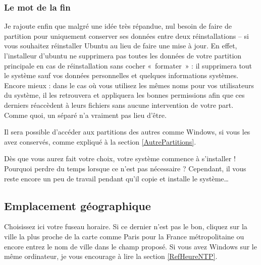 \subsubsection{Le mot de la fin}
Je rajoute enfin que malgré une idée très répandue, nul besoin de faire de partition  pour uniquement conserver ses données entre deux réinstallations -- si vous souhaitez réinstaller Ubuntu au lieu de faire une mise à jour. En effet, l'installeur d'ubuntu ne supprimera pas toutes les données de votre partition principale \Chemin{/} en cas de réinstallation sans cocher «~formater~» : il supprimera tout le système sauf vos données personnelles et quelques informations systèmes. Encore mieux : dans le cas où vous utilisez les mêmes noms pour vos utilisateurs du système, il les retrouvera et appliquera les bonnes permissions afin que ces derniers réaccèdent à leurs fichiers sans aucune intervention de votre part. Comme quoi, un  séparé n'a vraiment pas lieu d'être.
\begin{nota}
Il sera possible d'accéder aux partitions des autres  comme Windows, si vous les avez conservés, comme expliqué à la section \ref{AutrePartitions}.
\end{nota}
Dès que vous aurez fait votre choix, votre système commence à s'installer ! Pourquoi perdre du temps lorsque ce n'est pas nécessaire ? Cependant, il vous reste encore un peu de travail pendant qu'il copie et installe le système\ldots{}
\subsection{Emplacement géographique}
Choisissez ici votre fuseau horaire. Si ce dernier n'est pas le bon, cliquez sur la ville la plus proche de la carte comme Paris pour la France métropolitaine ou encore entrez le nom de ville dans le champ proposé. Si vous avez Windows sur le même ordinateur, je vous encourage à lire la section \ref{RefHeureNTP}.
